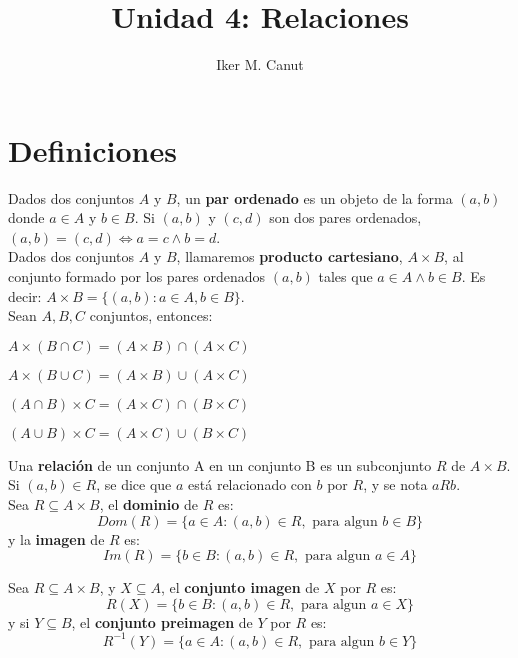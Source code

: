\documentclass[11pt,a4paper]{article}
\author{Iker M. Canut}
\title{Unidad 4: Relaciones}
\begin{document}
\maketitle
\newpage

\section{Definiciones}
Dados dos conjuntos $A$ y $B$, un \textbf{par ordenado} es un objeto de la forma $(a,b)$ donde $a \in A$ y $b \in B$. Si $(a,b)$ y $(c,d)$ son dos pares ordenados, $(a,b) = (c,d) \iff a=c \land b=d$.\\

Dados dos conjuntos $A$ y $B$, llamaremos \textbf{producto cartesiano}, $A\times B$, al conjunto formado por los pares ordenados $(a,b)$ tales que $a\in A \land b\in B$. Es decir: $A\times B = \{(a,b):a\in A, b\in B\}$.\\

Sean $A,B, C$ conjuntos, entonces:
\begin{itemize}
\begin{multicols}{2}
\item $A \times (B \cap C) = (A \times B) \cap (A \times C)$
\item $A \times (B \cup C) = (A \times B) \cup (A \times C)$
\item $(A \cap B) \times C = (A \times C) \cap (B \times C)$
\item $(A \cup B) \times C = (A \times C) \cup (B \times C)$
\end{multicols}
\end{itemize}

\noindent \dotfill

Una \textbf{relaci\'on} de un conjunto A en un conjunto B es un subconjunto $R$ de $A \times B$. Si $(a,b) \in R$, se dice que $a$ est\'a relacionado con $b$ por $R$, y se nota $aRb$.\\

Sea $R \subseteq A \times B$, el \textbf{dominio} de $R$ es:
$$Dom(R) = \{ a \in A:(a,b) \in R, \text{ para algun } b\in B \}$$
\indent y la \textbf{imagen} de $R$ es:
$$Im(R) = \{ b\in B : (a,b)\in R, \text{ para algun } a \in A \}$$
\noindent \dotfill

Sea $R \subseteq A \times B$, y $X \subseteq A$, el \textbf{conjunto imagen} de $X$ por $R$ es:
$$R(X) = \{ b\in B : (a,b) \in R, \text{ para algun } a \in X \}$$
\indent y si $Y \subseteq B$, el \textbf{conjunto preimagen} de $Y$ por $R$ es:
$$R^{-1}(Y) = \{ a\in A : (a,b) \in R, \text{ para algun } b \in Y \}$$
\end{document}
